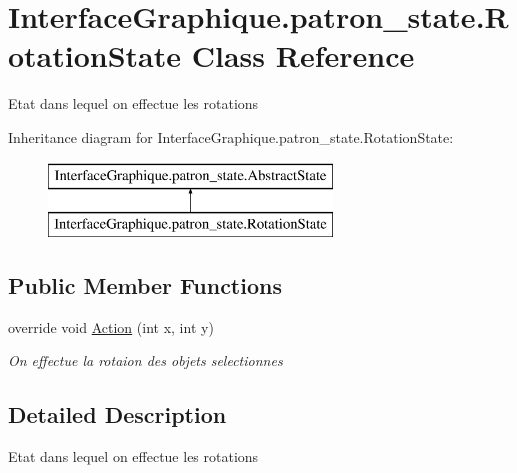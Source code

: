 \hypertarget{class_interface_graphique_1_1patron__state_1_1_rotation_state}{\section{Interface\-Graphique.\-patron\-\_\-state.\-Rotation\-State Class Reference}
\label{class_interface_graphique_1_1patron__state_1_1_rotation_state}
}


Etat dans lequel on effectue les rotations  


Inheritance diagram for Interface\-Graphique.\-patron\-\_\-state.\-Rotation\-State\-:\begin{figure}[H]
\begin{center}
\leavevmode
\includegraphics[height=2.000000cm]{class_interface_graphique_1_1patron__state_1_1_rotation_state}
\end{center}
\end{figure}
\subsection*{Public Member Functions}
\begin{DoxyCompactItemize}
\item 
override void \hyperlink{class_interface_graphique_1_1patron__state_1_1_rotation_state_aa115b089fcafb2b25b8a27f19b55ef31}{Action} (int x, int y)
\begin{DoxyCompactList}\small\item\em On effectue la rotaion des objets selectionnes \end{DoxyCompactList}\end{DoxyCompactItemize}


\subsection{Detailed Description}
Etat dans lequel on effectue les rotations 



